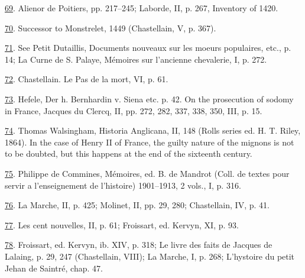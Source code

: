 \protect\hypertarget{23_NOTES.xhtmlux5cux23id_1952}{\protect\hyperlink{09_Chapter_Two__THE_CRAVING_FOR_A_M.xhtmlux5cux23id_1951}{69}}.
Alienor de Poitiers, pp. 217--245; Laborde, II, p. 267, Inventory of
1420.

\protect\hypertarget{23_NOTES.xhtmlux5cux23id_1950}{\protect\hyperlink{09_Chapter_Two__THE_CRAVING_FOR_A_M.xhtmlux5cux23id_1949}{70}}.
Successor to Monstrelet, 1449 (Chastellain, V, p. 367).

\protect\hypertarget{23_NOTES.xhtmlux5cux23id_1948}{\protect\hyperlink{09_Chapter_Two__THE_CRAVING_FOR_A_M.xhtmlux5cux23id_1947}{71}}.
See Petit Dutaillis, Documents nouveaux sur les moeurs populaires, etc.,
p. 14; La Curne de S. Palaye, Mémoires sur l'ancienne chevalerie, I, p.
272.

\protect\hypertarget{23_NOTES.xhtmlux5cux23id_1946}{\protect\hyperlink{09_Chapter_Two__THE_CRAVING_FOR_A_M.xhtmlux5cux23id_1945}{72}}.
Chastellain. Le Pas de la mort, VI, p. 61.

\protect\hypertarget{23_NOTES.xhtmlux5cux23id_1944}{\protect\hyperlink{09_Chapter_Two__THE_CRAVING_FOR_A_M.xhtmlux5cux23id_1943}{73}}.
Hefele, Der h. Bernhardin v. Siena etc. p. 42. On the prosecution of
sodomy in France, Jacques du Clercq, II, pp. 272, 282, 337, 338, 350,
III, p. 15.

\protect\hypertarget{23_NOTES.xhtmlux5cux23id_1942}{\protect\hyperlink{09_Chapter_Two__THE_CRAVING_FOR_A_M.xhtmlux5cux23id_1941}{74}}.
Thomas Walsingham, Historia Anglicana, II, 148 (Rolls series ed. H. T.
Riley, 1864). In the case of Henry II of France, the guilty nature of
the mignons is not to be doubted, but this happens at the end of the
sixteenth century.

\protect\hypertarget{23_NOTES.xhtmlux5cux23id_1940}{\protect\hyperlink{09_Chapter_Two__THE_CRAVING_FOR_A_M.xhtmlux5cux23id_1939}{75}}.
Philippe de Commines, Mémoires, ed. B. de Mandrot (Coll. de textes pour
servir a l'enseignement de l'histoire) 1901--1913, 2 vols., I, p. 316.

\protect\hypertarget{23_NOTES.xhtmlux5cux23id_1938}{\protect\hyperlink{09_Chapter_Two__THE_CRAVING_FOR_A_M.xhtmlux5cux23id_1937}{76}}.
La Marche, II, p. 425; Molinet, II, pp. 29, 280; Chastellain, IV, p. 41.

\protect\hypertarget{23_NOTES.xhtmlux5cux23id_1936}{\protect\hyperlink{09_Chapter_Two__THE_CRAVING_FOR_A_M.xhtmlux5cux23id_1935}{77}}.
Les cent nouvelles, II, p. 61; Froissart, ed. Kervyn, XI, p. 93.

\protect\hypertarget{23_NOTES.xhtmlux5cux23id_1934}{\protect\hyperlink{09_Chapter_Two__THE_CRAVING_FOR_A_M.xhtmlux5cux23id_1933}{78}}.
Froissart, ed. Kervyn, ib. XIV, p. 318; Le livre des faits de Jacques de
Lalaing, p. 29, 247 (Chastellain, VIII); La Marche, I, p. 268;
L'hystoire du petit Jehan de Saintré, chap. 47.

